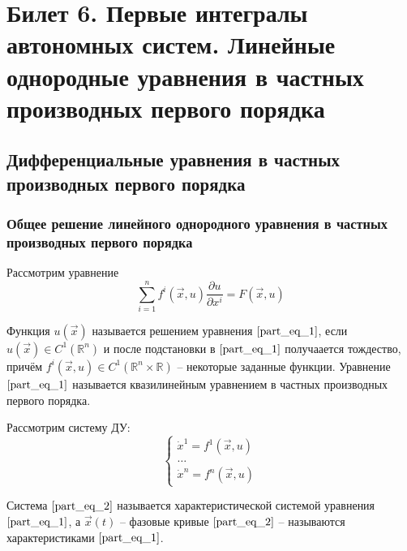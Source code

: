 \documentclass[a4paper, 12pt]{article}
\begin{document}
    \section{Билет 6. Первые интегралы автономных систем. Линейные однородные уравнения в частных производных первого порядка}

    \subsection{Дифференциальные уравнения в частных производных первого порядка}
    
    \subsubsection{Общее решение линейного однородного уравнения в частных производных первого порядка}

    \begin{definition}
        Рассмотрим уравнение
        \begin{equation}
            \sum \limits_{i = 1}^{n} f^{i} \left( \overrightarrow{x}, u \right) \frac{\partial u}{\partial x^{i}} = F \left( \overrightarrow{x}, u \right)
            \label{part_eq_1}
        \end{equation}

        Функция $u \left( \overrightarrow{x} \right)$ называется решением уравнения $\eqref{part_eq_1}$, если $u \left( \overrightarrow{x} \right) \in C^{1} \left( \mathbb{R}^n \right)$ и после подстановки в $\eqref{part_eq_1}$ получаается тождество, причём $f^{i} \left( \overrightarrow{x}, u \right) \in C^{1} \left( \mathbb{R}^n \times \mathbb{R} \right)$ -- некоторые заданные функции. Уравнение $\eqref{part_eq_1}$ называется квазилинейным уравнением в частных производных первого порядка. 
    \end{definition}
    
    \begin{definition}
        Рассмотрим систему ДУ:
        \begin{equation}
            \begin{cases}
                \dot{x}^1 = f^1 \left( \overrightarrow{x}, u \right) \\
                \dots                                                \\
                \dot{x}^n = f^n \left( \overrightarrow{x}, u \right)
            \end{cases}
            \label{part_eq_2}
        \end{equation}
    
        Система $\eqref{part_eq_2}$ называется характеристической системой уравнения $\eqref{part_eq_1}$, а $\overrightarrow{x} \left( t \right) $ -- фазовые кривые $\eqref{part_eq_2}$ -- называются характеристиками $\eqref{part_eq_1}$.
    \end{definition}
   
\end{document}
